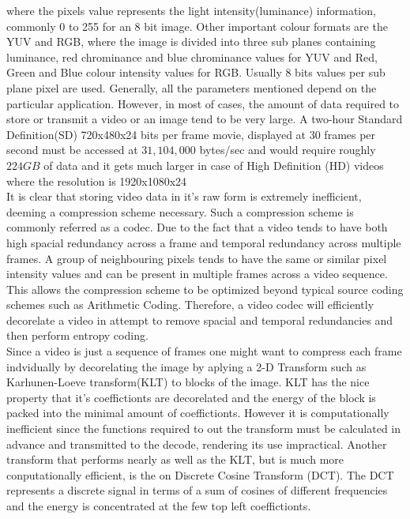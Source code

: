 \documentclass[a4paper,11pt,oneside]{article}
\begin{document}
where the pixels value represents the light intensity(luminance) information, commonly 0 to 255 for an 8 bit image. Other important colour formats are the YUV and RGB, where the
image is divided into three sub planes containing luminance, red chrominance and blue chrominance values for YUV and Red, Green and Blue colour intensity values for RGB. Usually 8
bits values per sub plane pixel   are used. Generally, all the parameters mentioned depend on the particular application. However, in most of cases, the amount of data required to
store or transmit a video or an image tend to be very large. A two-hour Standard Definition(SD) 720x480x24 bits per frame movie, displayed at 30 frames per second must be accessed
at $ 31,104,000 $ bytes/sec
and would require roughly $224 GB$ of data and it gets much larger in case of High Definition (HD) videos where the resolution is 1920x1080x24 \cite[p.~525-526]{gonzalez2008digital} \\
\indent It is clear that storing video data in it's raw form is extremely inefficient, deeming a compression scheme necessary. Such a compression scheme is commonly referred as a codec.
Due to the fact that a video tends to have both high spacial redundancy across a frame and temporal redundancy across multiple frames. A group of neighbouring pixels tends to have
the same or similar pixel intensity values and can be present in multiple frames across a video sequence. This allows the compression scheme to be optimized beyond typical source coding
schemes such as Arithmetic Coding. Therefore, a video codec will efficiently decorelate a video in attempt to remove spacial and temporal redundancies and then perform entropy coding.\\

\indent %
Since a video is just a sequence of frames one might want to compress each frame indvidually by decorelating the image by aplying a 2-D Transform such as Karhunen-Loeve transform(KLT) to blocks
of the image. KLT has the nice property that it's coeffictionts are decorelated and the energy of the block is packed into the minimal amount of coeffictionts. However it is computationally 
inefficient since the functions required to out the transform must be calculated in advance and transmitted to the decode, rendering its use impractical. Another transform that performs nearly 
as well as the KLT, but is much more conputationally efficient, is the on Discrete Cosine Transform (DCT). The DCT represents a discrete signal in terms of a sum of cosines of different frequencies
and the energy is concentrated at the few top left coeffictionts.
\end{document}
